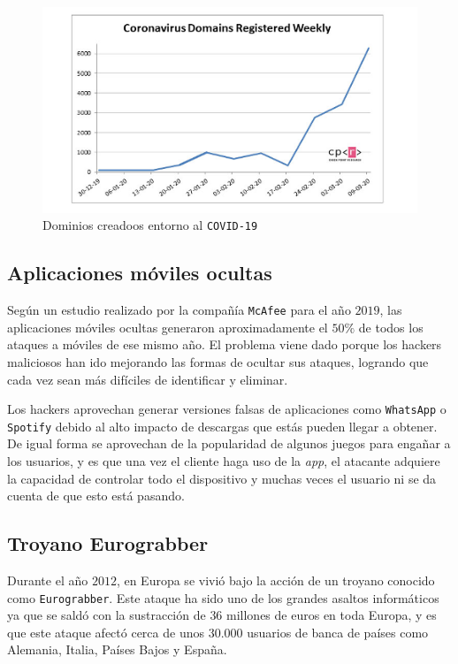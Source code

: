 \documentclass[12pt]{article}
\newcommand{\newpar} {
    \vskip 0.5cm
}
\begin{document}
            \begin{figure}
                \centering
                \includegraphics[width=\linewidth]{covid_malware.png}
                \caption{Dominios creadoos entorno al \texttt{COVID-19}}
                \label{f:covid_malware}
            \end{figure}

        \subsection{Aplicaciones móviles ocultas}
            Según un estudio realizado por la compañía \texttt{McAfee} para el año $2019$, las aplicaciones móviles ocultas generaron aproximadamente el $50\%$ de todos los ataques a móviles de ese mismo año. El problema viene dado porque los hackers maliciosos han ido mejorando las formas de ocultar sus ataques, logrando que cada vez sean más difíciles de identificar y eliminar.

            \newpar

            Los hackers aprovechan generar versiones falsas de aplicaciones como \texttt{WhatsApp} o \texttt{Spotify} debido al alto impacto de descargas que estás pueden llegar a obtener. De igual forma se aprovechan de la popularidad de algunos juegos para engañar a los usuarios, y es que una vez el cliente haga uso de la \textit{app}, el atacante adquiere la capacidad de controlar todo el dispositivo y muchas veces el usuario ni se da cuenta de que esto está pasando.

        \subsection{Troyano Eurograbber}
            Durante el año $2012$, en Europa se vivió bajo la acción de un troyano conocido como \texttt{Eurograbber}. Este ataque ha sido uno de los grandes asaltos informáticos ya que se saldó con la sustracción de $36$ millones de euros en toda Europa, y es que este ataque afectó cerca de unos $30.000$ usuarios de banca de países como Alemania, Italia, Países Bajos y España.
\end{document}

